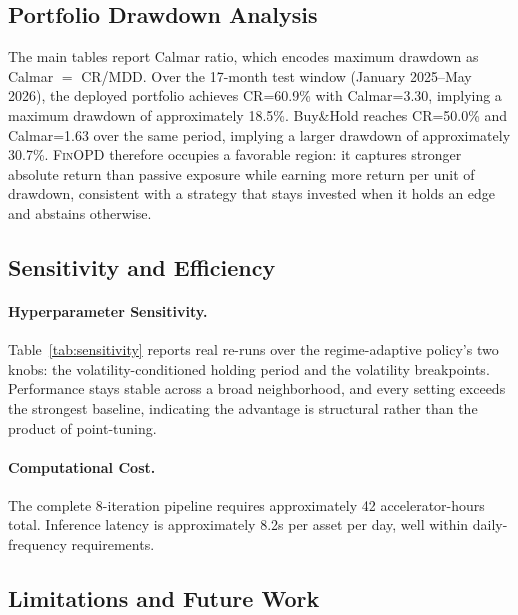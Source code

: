 \subsection{Portfolio Drawdown Analysis}
\label{sec:full_results}

The main tables report Calmar ratio, which encodes maximum drawdown as Calmar $=$ CR/MDD. Over the 17-month test window (January 2025--May 2026), the deployed portfolio achieves CR=60.9\% with Calmar=3.30, implying a maximum drawdown of approximately 18.5\%. Buy\&Hold reaches CR=50.0\% and Calmar=1.63 over the same period, implying a larger drawdown of approximately 30.7\%. \textsc{FinOPD} therefore occupies a favorable region: it captures stronger absolute return than passive exposure while earning more return per unit of drawdown, consistent with a strategy that stays invested when it holds an edge and abstains otherwise.

\subsection{Sensitivity and Efficiency}
\label{sec:appendix_additional}



\paragraph{Hyperparameter Sensitivity.} Table~\ref{tab:sensitivity} reports real re-runs over the regime-adaptive policy's two knobs: the volatility-conditioned holding period and the volatility breakpoints. Performance stays stable across a broad neighborhood, and every setting exceeds the strongest baseline, indicating the advantage is structural rather than the product of point-tuning.



\paragraph{Computational Cost.} The complete 8-iteration pipeline requires approximately 42 accelerator-hours total. Inference latency is approximately 8.2s per asset per day, well within daily-frequency requirements.

\subsection{Limitations and Future Work}
\label{sec:limitations}

